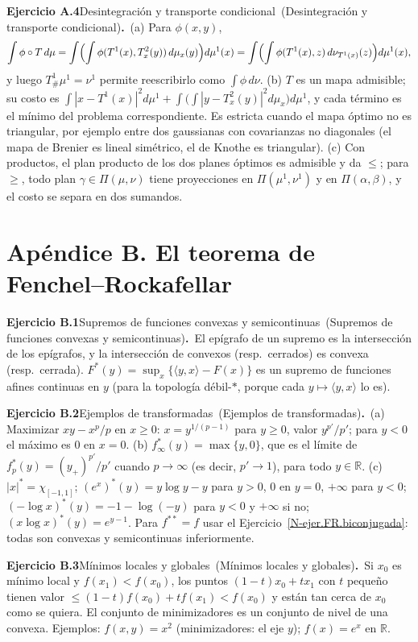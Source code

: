 \documentclass[11pt,a4paper]{amsart}
\newcommand{\R}{{\mathbb R}}
\theoremstyle{remark}
\theoremstyle{definition}
\numberwithin{subsection}{section}
\numberwithin{equation}{section}
\newcommand{\ejlabel}[2]{\par\medskip\noindent\textbf{Ejercicio #1}\ifx\relax#2\relax\else\ (#2)\fi\textbf{.}\ }
\begin{document}
\ejlabel{A.4}{Desintegración y transporte condicional}(a) Para $\phi(x,y)$,
\[
\int\phi\circ T\,d\mu
=\int\Bigl(\int\phi(T^1(x),T^2_x(y))\,d\mu_x(y)\Bigr)d\mu^1(x)
=\int\Bigl(\int\phi(T^1(x),z)\,d\nu_{T^1(x)}(z)\Bigr)d\mu^1(x),
\]
y luego $T^1_\#\mu^1=\nu^1$ permite reescribirlo como $\int\phi\,d\nu$. (b) $T$ es un mapa admisible; su costo es $\int|x-T^1(x)|^2d\mu^1+\int\bigl(\int|y-T^2_x(y)|^2d\mu_x\bigr)d\mu^1$, y cada término es el mínimo del problema correspondiente. Es estricta cuando el mapa óptimo no es triangular, por ejemplo entre dos gaussianas con covarianzas no diagonales (el mapa de Brenier es lineal simétrico, el de Knothe es triangular). (c) Con productos, el plan producto de los dos planes óptimos es admisible y da $\le$; para $\ge$, todo plan $\gamma\in\Pi(\mu,\nu)$ tiene proyecciones en $\Pi(\mu^1,\nu^1)$ y en $\Pi(\alpha,\beta)$, y el costo se separa en dos sumandos.

\section*{Apéndice B. El teorema de Fenchel--Rockafellar}
\ejlabel{B.1}{Supremos de funciones convexas y semicontinuas}El epígrafo de un supremo es la intersección de los epígrafos, y la intersección de convexos (resp.\ cerrados) es convexa (resp.\ cerrada). $F^*(y)=\sup_x\{\langle y,x\rangle-F(x)\}$ es un supremo de funciones afines continuas en $y$ (para la topología débil-$*$, porque cada $y\mapsto\langle y,x\rangle$ lo es).

\ejlabel{B.2}{Ejemplos de transformadas}(a) Maximizar $xy-x^p/p$ en $x\ge0$: $x=y^{1/(p-1)}$ para $y\ge0$, valor $y^{p'}/p'$; para $y<0$ el máximo es $0$ en $x=0$. (b) $f_\infty^*(y)=\max\{y,0\}$, que es el límite de $f_p^*(y)=(y_+)^{p'}/p'$ cuando $p\to\infty$ (es decir, $p'\to1$), para todo $y\in\R$. (c) $|x|^*=\chi_{[-1,1]}$; $(e^x)^*(y)=y\log y-y$ para $y>0$, $0$ en $y=0$, $+\infty$ para $y<0$; $(-\log x)^*(y)=-1-\log(-y)$ para $y<0$ y $+\infty$ si no; $(x\log x)^*(y)=e^{y-1}$. Para $f^{**}=f$ usar el Ejercicio~\ref{N-ejer.FR.biconjugada}: todas son convexas y semicontinuas inferiormente.

\ejlabel{B.3}{Mínimos locales y globales}Si $x_0$ es mínimo local y $f(x_1)<f(x_0)$, los puntos $(1-t)x_0+tx_1$ con $t$ pequeño tienen valor $\le(1-t)f(x_0)+tf(x_1)<f(x_0)$ y están tan cerca de $x_0$ como se quiera. El conjunto de minimizadores es un conjunto de nivel de una convexa. Ejemplos: $f(x,y)=x^2$ (minimizadores: el eje $y$); $f(x)=e^x$ en $\R$.
\end{document}
